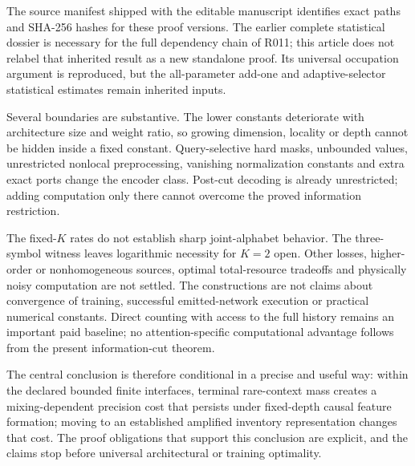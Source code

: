 \documentclass[11pt,letterpaper]{article}
\theoremstyle{definition}\newtheorem{definition}[theorem]{Definition}
\theoremstyle{remark}\newtheorem{remark}[theorem]{Remark}
\newcommand{\unit}[1]{\textsf{#1}}
\begin{document}
The source manifest shipped with the editable manuscript identifies exact paths and SHA-256 hashes for these proof versions. The earlier complete statistical dossier is necessary for the full dependency chain of \unit{R011}; this article does not relabel that inherited result as a new standalone proof. Its universal occupation argument is reproduced, but the all-parameter add-one and adaptive-selector statistical estimates remain inherited inputs.

Several boundaries are substantive. The lower constants deteriorate with architecture size and weight ratio, so growing dimension, locality or depth cannot be hidden inside a fixed constant. Query-selective hard masks, unbounded values, unrestricted nonlocal preprocessing, vanishing normalization constants and extra exact ports change the encoder class. Post-cut decoding is already unrestricted; adding computation only there cannot overcome the proved information restriction.

The fixed-$K$ rates do not establish sharp joint-alphabet behavior. The three-symbol witness leaves logarithmic necessity for $K=2$ open. Other losses, higher-order or nonhomogeneous sources, optimal total-resource tradeoffs and physically noisy computation are not settled. The constructions are not claims about convergence of training, successful emitted-network execution or practical numerical constants. Direct counting with access to the full history remains an important paid baseline; no attention-specific computational advantage follows from the present information-cut theorem.

The central conclusion is therefore conditional in a precise and useful way: within the declared bounded finite interfaces, terminal rare-context mass creates a mixing-dependent precision cost that persists under fixed-depth causal feature formation; moving to an established amplified inventory representation changes that cost. The proof obligations that support this conclusion are explicit, and the claims stop before universal architectural or training optimality.

\begingroup
\small
\setlength{\bibsep}{4pt}


\endgroup
\end{document}
